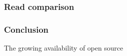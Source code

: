 \documentclass[handout]{beamer}
\begin{document}
\begin{frame}
\frametitle{Read comparison}
\end{frame}


\begin{frame}
\frametitle{Conclusion}
\item The growing availability of open source 

\end{frame}

\end{document}
